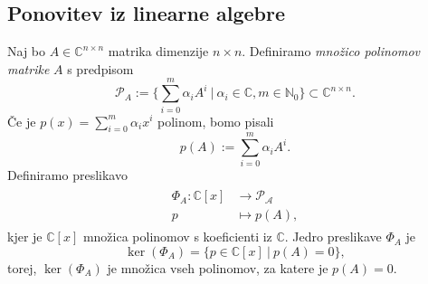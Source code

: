 \documentclass[mat1]{fmfdelo}
\newcommand{\N}{\mathbb N}
\newcommand{\C}{\mathbb C}
\begin{document}
\subsection{Ponovitev iz linearne algebre}\label{linearnaAlgebra}
Naj bo $A \in \C^{n \times n}$ matrika dimenzije $n \times n$. Definiramo \emph{množico polinomov matrike} $A$ s predpisom
\begin{equation*}
    \mathcal{P}_A := \Big\{ \sum_{i=0}^m \alpha_i A^i\ |\  \alpha_i \in \C, m \in \N_0 \Big\} \subset \C^{n \times n}.
\end{equation*}
Če je $p(x) = \sum_{i=0}^m \alpha_i x^i$ polinom, bomo pisali
\begin{equation*}
    p(A) := \sum_{i=0}^m \alpha_i A^i.
\end{equation*}
Definiramo preslikavo
\begin{align}
\begin{split}
    \Phi_A : \C [x] &\longrightarrow \mathcal{P_A} \\
    p &\longmapsto p(A),
\end{split}
\end{align}
kjer je $\C [x]$ množica polinomov s koeficienti iz $\C$. Jedro preslikave $\Phi_A$ je
\begin{equation*}
    \ker \left(\Phi_A\right) = \Big\{ p \in \C [x] \ | \  p(A) = 0 \Big\},
\end{equation*}
torej, $\ker\left(\Phi_A\right)$ je množica vseh polinomov, za katere je $p(A) = 0$.
\end{document}
